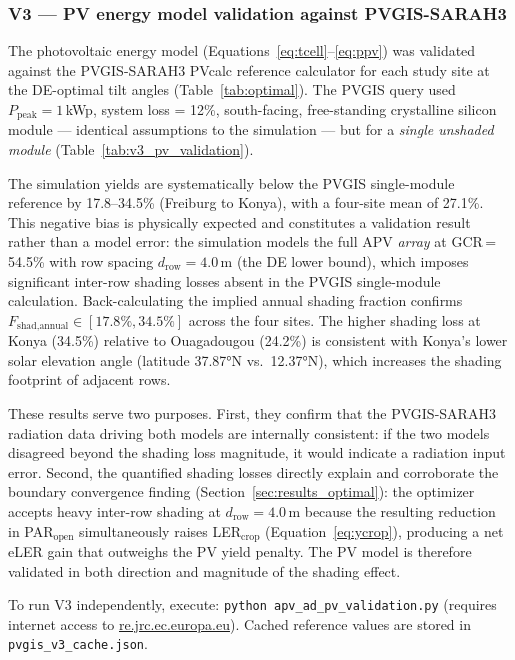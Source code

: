 \subsubsection{V3 --- PV energy model validation against PVGIS-SARAH3}

The photovoltaic energy model (Equations~\ref{eq:tcell}--\ref{eq:ppv}) was
validated against the PVGIS-SARAH3 PVcalc reference calculator
\citep{huld2012} for each study site at the DE-optimal tilt angles
(Table~\ref{tab:optimal}).
The PVGIS query used $P_{\text{peak}} = 1$\,kWp, system loss = 12\%,
south-facing, free-standing crystalline silicon module ---
identical assumptions to the simulation --- but for a \emph{single
unshaded module} (Table~\ref{tab:v3_pv_validation}).

The simulation yields are systematically below the PVGIS single-module
reference by 17.8--34.5\% (Freiburg to Konya), with a four-site mean of
27.1\%.
This negative bias is physically expected and constitutes a validation
result rather than a model error: the simulation models the full APV
\emph{array} at GCR\,=\,54.5\% with row spacing $d_{\text{row}}=4.0$\,m
(the DE lower bound), which imposes significant inter-row shading losses
absent in the PVGIS single-module calculation.
Back-calculating the implied annual shading fraction confirms
$F_{\text{shad,annual}} \in [17.8\%, 34.5\%]$ across the four sites.
The higher shading loss at Konya (34.5\%) relative to Ouagadougou (24.2\%)
is consistent with Konya's lower solar elevation angle (latitude 37.87°N
vs.\ 12.37°N), which increases the shading footprint of adjacent rows.

These results serve two purposes.
First, they confirm that the PVGIS-SARAH3 radiation data driving both
models are internally consistent: if the two models disagreed beyond the
shading loss magnitude, it would indicate a radiation input error.
Second, the quantified shading losses directly explain and corroborate the
boundary convergence finding (Section~\ref{sec:results_optimal}): the
optimizer accepts heavy inter-row shading at $d_{\text{row}}=4.0$\,m
because the resulting reduction in PAR$_{\text{open}}$ simultaneously
raises LER$_{\text{crop}}$ (Equation~\ref{eq:ycrop}), producing a net
eLER gain that outweighs the PV yield penalty.
The PV model is therefore validated in both direction and magnitude of
the shading effect.

To run V3 independently, execute: \texttt{python apv\_ad\_pv\_validation.py}
(requires internet access to \url{re.jrc.ec.europa.eu}).
Cached reference values are stored in \texttt{pvgis\_v3\_cache.json}.
